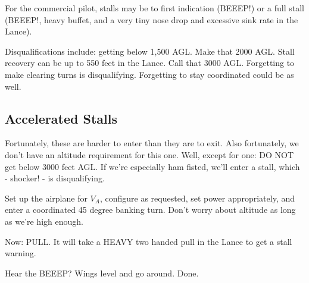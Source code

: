 For the commercial pilot, stalls may be to first indication (BEEEP!) or a full stall (BEEEP!, heavy buffet, and a very tiny nose drop and excessive sink rate in the Lance).

Disqualifications include: getting below 1,500 AGL. Make that 2000 AGL. Stall recovery can be up to 550 feet in the Lance. Call that 3000 AGL. Forgetting to make clearing turns is disqualifying. Forgetting to stay coordinated could be as well.

\subsection{Accelerated Stalls}

Fortunately, these are harder to enter than they are to exit. Also fortunately, we don't have an altitude requirement for this one. Well, except for one: DO NOT get below 3000 feet AGL. If we're especially ham fisted, we'll enter a stall, which - shocker! - is disqualifying.

Set up the airplane for $V_A$, configure as requested, set power appropriately, and enter a coordinated 45 degree banking turn. Don't worry about altitude as long as we're high enough.

Now: PULL. It will take a HEAVY two handed pull in the Lance to get a stall warning.

Hear the BEEEP? Wings level and go around. Done.


